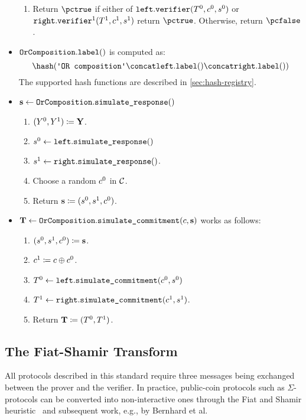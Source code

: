 \documentclass[11pt]{article}
\begin{document}
\begin{itemize}
\begin{enumerate}
      \item
	    Return $\pctrue$ if either of $\texttt{left}.\texttt{verifier}(T^0,c^0,s^0)$ or $\texttt{right}.\texttt{verifier}^1(T^1,c^1,s^1)$ return $\pctrue$. Otherwise, return $\pcfalse$.
    \end{enumerate}
  \item  $\texttt{OrComposition}.\texttt{label}()$ is computed as:
    \[
     \hash(\orlabel \concat \leftbranch.\labeltt() \concat \rightbranch.\labeltt())
   \]
   The supported hash functions are described in \cref{sec:hash-registry}.
  \item
  $\mathbf {s} \gets \texttt{OrComposition}.\texttt{simulate\_response}()$
    \begin{enumerate}
      \item
         $(Y^0,Y^1)\coloneqq \mathbf {Y}$.
      \item
         $s^0\gets\texttt{left}.\texttt{simulate\_response}()$
      \item $s^1\gets\texttt{right}.\texttt{simulate\_response}()$.
      \item
        Choose a random $c^0$ in $\mathcal{C}$.
			\item
        Return $\mathbf {s} \coloneqq (s^0,s^1,c^0)$.
    \end{enumerate}
\item
$\mathbf {T} \gets \texttt{OrComposition}.\texttt{simulate\_commitment}(c, \mathbf {s})$ works as follows:
\begin{enumerate}
      \item
        $(s^0,s^1,c^0)\coloneqq\mathbf{s}$.
      \item
        $c^1\coloneqq c \oplus c^0$.
      \item
        $T^0 \gets\texttt{left}.\texttt{simulate\_commitment}(c^0,s^0)$
    \item $T^1\gets\texttt{right}.\texttt{simulate\_commitment}(c^1,s^1)$.
      \item
        Return $\mathbf {T} \coloneqq (T^0,T^1)$.
    \end{enumerate}
\end{itemize}


\subsection{The Fiat-Shamir Transform}\label{sec:fs}
All protocols described in this standard require three messages being exchanged between the prover and the verifier.
In practice, public-coin protocols such as $\Sigma$-protocols can be converted into non-interactive ones through the
Fiat and Shamir heuristic~\cite{C:FiaSha86} and subsequent work, e.g., by Bernhard et al.~\cite{AC:BerPerWar12}
\end{document}
